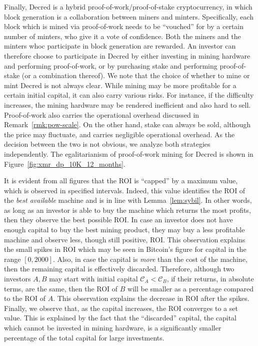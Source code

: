 Finally, Decred is a hybrid proof-of-work/proof-of-stake cryptocurrency, in
which block generation is a collaboration between miners and minters.
Specifically, each block which is mined via proof-of-work needs to be
``vouched'' for by a certain number of minters, who give it a vote of
confidence. Both the miners and the minters whoc participate in block
generation are rewarded. An investor can therefore choose to participate in
Decred by either investing in mining hardware and performing proof-of-work, or
by purchasing stake and performing proof-of-stake (or a combination thereof).
We note that the choice of whether to mine or mint Decred is not always clear.
While mining may be more profitable for a certain initial capital, it can also
carry various risks. For instance, if the difficulty increases, the mining
hardware may be rendered inefficient and also hard to sell. Proof-of-work also
carries the operational overhead discussed in Remark~\ref{rmk:pow-scale}. On
the other hand, stake can always be sold, although the price may fluctuate, and
carries negligible operational overhead. As the decision between the two is not
obvious, we analyze both strategies independently. The egalitarianism of
proof-of-work mining for Decred is shown in
Figure~\ref{fig:xmr_dp_10K_12_months}.

It is evident from all figures that the ROI is ``capped'' by a maximum value,
which is observed in specified intervals. Indeed, this value identifies the
ROI of the \emph{best available} machine and is in line with Lemma~\ref{lem:sybil}. In other words, as long as an
investor is able to buy the machine which returns the most profits, then they
observe the best possible ROI. In case an investor does not have enough capital
to buy the best mining product, they may buy a less profitable machine and
observe less, though still positive, ROI. This observation explains the small
spikes in ROI which may be seen \eg in Bitcoin's figure for capital in the
range $[0, 2000]$. Also, in case the capital is \emph{more} than the cost of
the machine, then the remaining capital is effectively discarded. Therefore,
although two investors $A, B$ may start with initial capital $\mathcal{C}_A <
\mathcal{C}_B$, if their returns, in absolute terms, are the same, then the ROI
of $B$ will be smaller as a percentage compared to the ROI of $A$. This
observation explains the decrease in ROI after the spikes. Finally, we observe
that, as the capital increases, the ROI converges to a set value. This is
explained by the fact that the ``discarded'' capital, \ie the capital which
cannot be invested in mining hardware, is a significantly smaller percentage of
the total capital for large investments.

